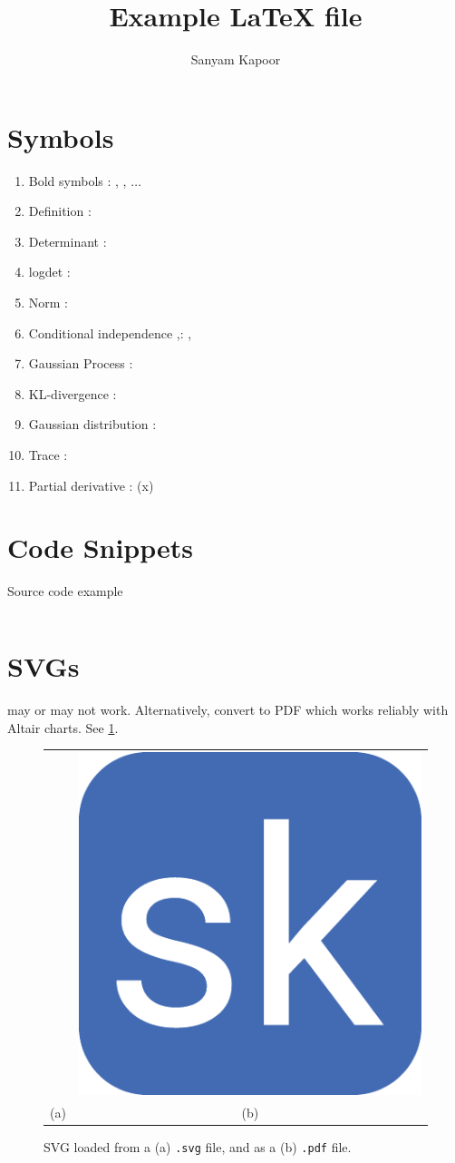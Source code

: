 \documentclass{article}
\title{Example \LaTeX{ }file}
\author{Sanyam Kapoor}
\begin{document}
\maketitle

\section{Symbols}

\begin{enumerate}%
\item Bold symbols \vrb{\mbf{}}: \mbf{\Sigma}, , $\dots$
\item Definition : 
\item Determinant \vrb{\determ{}}: \determ{\cdot}
\item logdet \vrb{\logdet{}}: \logdet{\cdot}
\item Norm \vrb{\norm{}}: \norm{\cdot}
\item Conditional independence \vrb{\ci},\vrb{\nci}: \ci, \nci
\item Gaussian Process \vrb{\gp}: \gp
\item KL-divergence \vrb{\kl}: \kl
\item Gaussian distribution \vrb{\gaussian{}}: \gaussian{\cdot, \cdot}
\item Trace \vrb{\tr{}}: \tr{\cdot}
\item Partial derivative \vrb{\pd{}{}}: (x)
\end{enumerate}

\section{Code Snippets}

\begin{code}
\caption{Source code example} \label{code:sample}
\inputminted[firstline=1,lastline=2,fontsize=\small]{python}{test.py}
\end{code}

\section{SVGs}

\vrb{} may or may not work. Alternatively, convert to PDF which works reliably with Altair charts. See \cref{fig:svg_pdf}.

\begin{figure}[ht]
    \centering
    \begin{tabular}{cc}
         & \includegraphics[width=0.15\linewidth]{favicon.pdf} \\
        (a) & (b)
    \end{tabular}
    \caption{SVG loaded from a (a) \texttt{.svg} file, and as a (b) \texttt{.pdf} file.}
    \label{fig:svg_pdf}
\end{figure}
\end{document}
